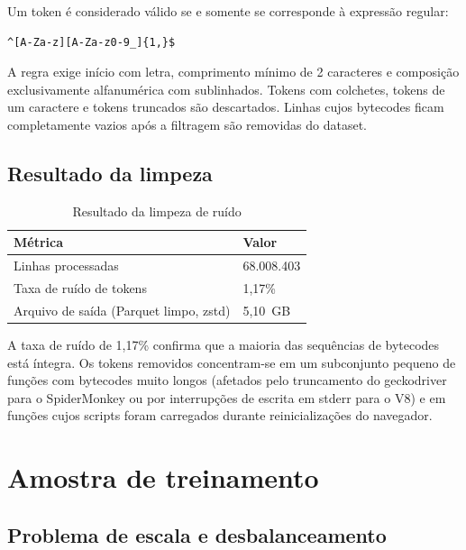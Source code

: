 Um token é considerado válido se e somente se corresponde à expressão regular:

\begin{lstlisting}[language={}]
^[A-Za-z][A-Za-z0-9_]{1,}$
\end{lstlisting}

A regra exige início com letra, comprimento mínimo de 2 caracteres e composição
exclusivamente alfanumérica com sublinhados. Tokens com colchetes, tokens de um
caractere e tokens truncados são descartados. Linhas cujos bytecodes ficam
completamente vazios após a filtragem são removidas do dataset.

\subsection{Resultado da limpeza}
\label{sub:ruido-resultado}

\begin{table}[htb]
\centering
\caption{Resultado da limpeza de ruído}
\label{tab:limpeza}
\begin{tabular}{ll}
\toprule
\textbf{Métrica} & \textbf{Valor} \\
\midrule
Linhas processadas                                            & 68.008.403 \\
Taxa de ruído de tokens                                       & 1,17\% \\
Arquivo de saída (Parquet limpo, zstd) & 5,10~GB \\
\bottomrule
\end{tabular}

\end{table}

A taxa de ruído de 1,17\% confirma que a maioria das sequências de bytecodes está
íntegra. Os tokens removidos concentram-se em um subconjunto pequeno de funções
com bytecodes muito longos (afetados pelo truncamento do geckodriver para o
SpiderMonkey ou por interrupções de escrita em stderr para o V8) e em funções
cujos scripts foram carregados durante reinicializações do navegador.

\section{Amostra de treinamento}
\label{sec:amostragem}

\subsection{Problema de escala e desbalanceamento}
\label{sub:escala}

